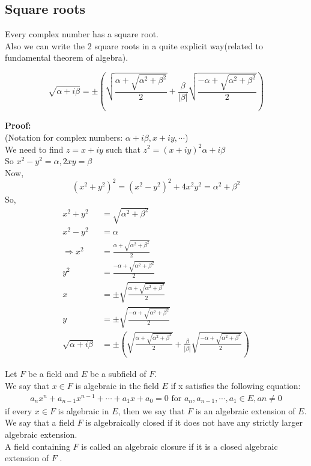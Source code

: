 \subsection{Square roots} 
Every complex number has a square root.
\\Also we can write the 2 square roots in a quite explicit way(related to fundamental theorem of algebra).
\begin{lemma}[]{}
$$ \sqrt{\alpha+i\beta}=\pm(\sqrt{\frac{\alpha+\sqrt{\alpha^2+\beta^2}}{2}}+\frac{\beta}{|\beta|}\sqrt{\frac{-\alpha+\sqrt{\alpha^2+\beta^2}}{2}}) $$ 
\end{lemma}
\textbf{Proof:}
\\(Notation for complex numbers: $ \alpha+i\beta,x+iy,\cdots $)
\\We need to find $ z=x+iy $ such that $ z^2={(x+iy)}^2\alpha+i\beta $ 
\\So $ x^2-y^2=\alpha, 2xy=\beta $ 
\\Now,
$$
    (x^2+y^2)^2=(x^2-y^2)^2+4x^2y^2=\alpha^2+\beta^2
$$ 
So, \begin{align*}{}{}
x^2+y^2&=\sqrt{\alpha^2+\beta^2}\\
x^2-y^2&=\alpha\\
\Rightarrow x^2&=\frac{\alpha+\sqrt{\alpha^2+\beta^2}}{2}\\
y^2&=\frac{-\alpha+\sqrt{\alpha^2+\beta^2}}{2}\\
x&=\pm\sqrt{\frac{\alpha+\sqrt{\alpha^2+\beta^2}}{2}}\\
y&=\pm\sqrt{\frac{-\alpha+\sqrt{\alpha^2+\beta^2}}{2}}\\
\sqrt{\alpha+i\beta}&=\pm(\sqrt{\frac{\alpha+\sqrt{\alpha^2+\beta^2}}{2}}+\frac{\beta}{|\beta|}\sqrt{\frac{-\alpha+\sqrt{\alpha^2+\beta^2}}{2}})
\end{align*} 
\begin{definition}{}
Let $ F $ be a field and $ E $ be a subfield of $ F $.
\\We say that $ x\in F $ is algebraic in the field $ E $ if x satisfies the following equation: 
\begin{align*}{}{}
a_nx^n+a_{n-1}x^{n-1}+\cdots+a_1x+a_0=0 \text{ for } a_n,a_{n-1},\cdots,a_1\in E, an\neq 0
\end{align*}
if every $ x\in F $ is algebraic in $ E $, then we say that $ F $ is an algebraic extension of $ E $.
\\We say that a field $ F $ is algebraically closed if it does not have any strictly larger algebraic extension.
\\A field containing $ F $ is called an algebraic closure if it is a closed algebraic extension of $ F $ . 
\end{definition}
